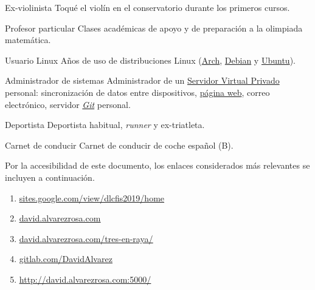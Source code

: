 

\cvachievement{\faMusic}
{Ex-violinista \smallskip}
{\small {}%
  \small{}}
Toqué el violín en el conservatorio durante los primeros cursos.

\divider

\cvachievement{\faGroup}
{Profesor particular \smallskip}
{Clases académicas de apoyo y de preparación a la olimpiada matemática.}

\divider

\cvachievement{\faLinux}
{Usuario Linux \smallskip}
{Años de uso de distribuciones Linux (\href{https://www.archlinux.org/}{Arch},
\href{https://www.debian.org/}{Debian} y \href{https://ubuntu.com/}{Ubuntu}).}

\divider

\cvachievement{\faServer}
{Administrador de sistemas}
{Administrador de un
\href{https://es.wikipedia.org/wiki/Servidor_virtual_privado}{Servidor Virtual
Privado} personal: sincronización de datos entre dispositivos,
\href{https://david.alvarezrosa.com}{página web\footnotemark}, correo
electrónico, servidor \href{https://es.wikipedia.org/wiki/Git}{\textit{Git}}
personal.}

\divider

\cvachievement{\faHeartbeat}
{Deportista \smallskip}
{Deportista habitual, \textit{runner} y ex-triatleta.}

\divider

\cvachievement{\faCar}
{Carnet de conducir \smallskip}
{\small {}%
  \small{}}
Carnet de conducir de coche español (B).


\medskip

Por la accesibilidad de este documento, los enlaces considerados más relevantes
se incluyen a continuación. \\[1.25ex]
\begin{enumerate}
  \item \href{https://sites.google.com/view/dlcfis2019/home}
  {\underline{sites.google.com/view/dlcfis2019/home}}
  \item \href{https://david.alvarezrosa.com}{\underline{david.alvarezrosa.com}}
  \item \href{https://david.alvarezrosa.com/tres-en-raya}
  {\underline{david.alvarezrosa.com/tres-en-raya/}}
  \item \href{https://gitlab.com/DavidAlvarez}
  {\underline{gitlab.com/DavidAlvarez}}
  \item \href{http://david.alvarezrosa.com:5000/}
  {\underline{http://david.alvarezrosa.com:5000/}}
\end{enumerate}
